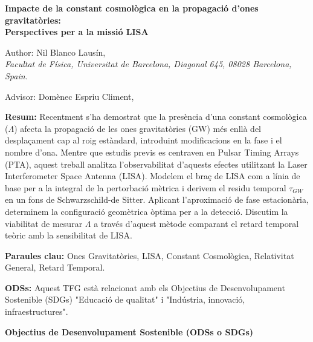 \documentclass[twocolumn]{revtex4-2}
\begin{document}
\vspace{1cm}


\begin{center}
    {\Large \textbf{Impacte de la constant cosmològica en la propagació d'ones gravitatòries:\\ Perspectives per a la missió LISA}}
    
    \vspace{0.5cm}
    
    Author:   Nil Blanco Lausín, \\
    \textit{Facultat de Física, Universitat de Barcelona, Diagonal 645, 08028 Barcelona, Spain.}
    
    \vspace{0.2cm}
    Advisor: Domènec Espriu Climent,
\end{center}

\vspace{0.5cm}

\noindent \textbf{Resum:} Recentment s'ha demostrat que la presència d'una constant cosmològica ($\Lambda$) afecta la propagació de les ones gravitatòries (GW) més enllà del desplaçament cap al roig estàndard, introduint modificacions en la fase i el nombre d'ona. Mentre que estudis previs es centraven en Pulsar Timing Arrays (PTA), aquest treball analitza l'observabilitat d'aquests efectes utilitzant la Laser Interferometer Space Antenna (LISA). Modelem el braç de LISA com a línia de base per a la integral de la pertorbació mètrica i derivem el residu temporal $\tau_{GW}$ en un fons de Schwarzschild-de Sitter. Aplicant l'aproximació de fase estacionària, determinem la configuració geomètrica òptima per a la detecció. Discutim la viabilitat de mesurar $\Lambda$ a través d'aquest mètode comparant el retard temporal teòric amb la sensibilitat de LISA.

\vspace{0.3cm}

\noindent \textbf{Paraules clau:} Ones Gravitatòries, LISA, Constant Cosmològica, Relativitat General, Retard Temporal.

\vspace{0.3cm}

\noindent \textbf{ODSs:} Aquest TFG està relacionat amb els Objectius de Desenvolupament Sostenible (SDGs) "Educació de qualitat" i "Indústria, innovació, infraestructures".

\vspace{0.3cm}

\begin{center}
\textbf{Objectius de Desenvolupament Sostenible (ODSs o SDGs)}
\end{center}
\end{document}
